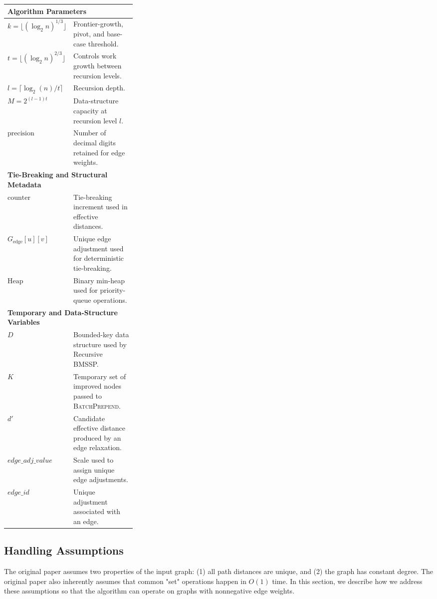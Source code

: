 \documentclass[ijoc,blindrev]{informs3} %
\begin{document}
\begin{table}[!htp]
\begin{adjustbox}{
    max width=\textwidth,
    max totalheight=0.88\textheight,
    keepaspectratio,
    center
}
\begin{minipage}[t]{0.6\textwidth}
\begin{tabularx}{\linewidth}{@{}p{0.30\linewidth}X@{}}
\multicolumn{2}{l}{\textbf{Algorithm Parameters}} \\
\hline
$k=\lfloor(\log_2 n)^{1/3}\rfloor$
    & Frontier-growth, pivot, and base-case threshold. \\
$t=\lfloor(\log_2 n)^{2/3}\rfloor$
    & Controls work growth between recursion levels. \\
$l=\lceil\log_2(n)/t\rceil$
    & Recursion depth. \\
$M=2^{(l-1)t}$
    & Data-structure capacity at recursion level $l$. \\
$\text{precision}$
    & Number of decimal digits retained for edge weights. \\
\hline

\multicolumn{2}{l}{\textbf{Tie-Breaking and Structural Metadata}} \\
\hline
$\text{counter}$ & Tie-breaking increment used in effective distances. \\
$G_{\text{edge}}[u][v]$
    & Unique edge adjustment used for deterministic tie-breaking. \\
$\text{Heap}$ & Binary min-heap used for priority-queue operations. \\
\hline

\multicolumn{2}{l}{\textbf{Temporary and Data-Structure Variables}} \\
\hline
$D$ & Bounded-key data structure used by Recursive BMSSP. \\
$K$ & Temporary set of improved nodes passed to \textsc{BatchPrepend}. \\
$d'$ & Candidate effective distance produced by an edge relaxation. \\
$\mathit{edge\_adj\_value}$ & Scale used to assign unique edge adjustments. \\
$\mathit{edge\_id}$ & Unique adjustment associated with an edge. \\
\hline

\end{tabularx}
\end{minipage}
\end{adjustbox}

\end{table}

\subsection{Handling Assumptions}\label{sec:handline_assumptions}
The original paper assumes two properties of the input graph: (1) all path distances are unique, and (2) the graph has constant degree. The original paper also inherently assumes that common "set" operations happen in $O(1)$ time. In this section, we describe how we address these assumptions so that the algorithm can operate on graphs with nonnegative edge weights.
\end{document}
